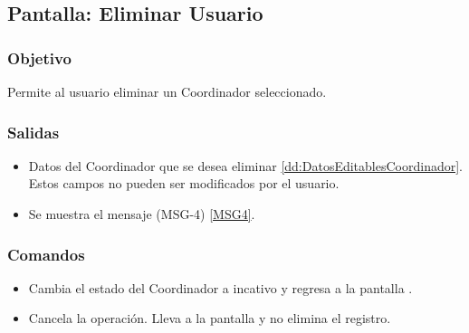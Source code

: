\subsection{Pantalla: Eliminar Usuario}

\subsubsection{Objetivo}
Permite al usuario eliminar un Coordinador seleccionado.


\subsubsection{Salidas}

\begin{itemize}
 \item Datos del Coordinador que se desea eliminar \ref{dd:DatosEditablesCoordinador}. Estos campos no pueden ser modificados por el usuario.
 \item Se muestra el mensaje (MSG-4) \ref{MSG4}.
\end{itemize}


\subsubsection{Comandos}
\begin{itemize}
 \item {} Cambia el estado del Coordinador a incativo y regresa a la pantalla .
 \item {} Cancela la operación. Lleva a la pantalla  y no elimina el registro.
\end{itemize}


